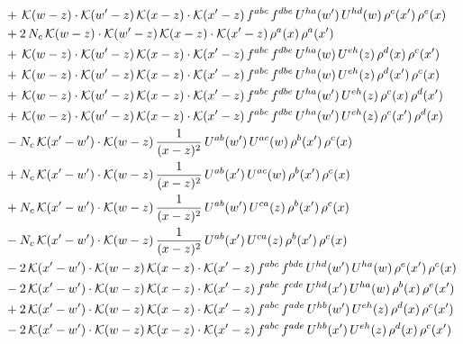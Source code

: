 \documentclass[9pt]{article}
\numberwithin{equation}{section}
\begin{document}
\begin{align}
&+\,\mathcal{K}(w-z)\cdot\mathcal{K}(w'-z)\,\mathcal{K}(x-z)\cdot\mathcal{K}(x'-z)\,f^{abc}\,f^{dbe}\,U^{ha}(w')\,U^{hd}(w)\,\rho^{c}(x')\,\rho^{e}(x)\notag\\
&+2\,N_{c}\,\mathcal{K}(w-z)\cdot\mathcal{K}(w'-z)\,\mathcal{K}(x-z)\cdot\mathcal{K}(x'-z)\,\rho^{a}(x)\,\rho^{a}(x')\notag\\
&+\,\mathcal{K}(w-z)\cdot\mathcal{K}(w'-z)\,\mathcal{K}(x-z)\cdot\mathcal{K}(x'-z)\,f^{abc}\,f^{dbe}\,U^{ha}(w)\,U^{eh}(z)\,\rho^{d}(x)\,\rho^{c}(x')\notag\\
&+\,\mathcal{K}(w-z)\cdot\mathcal{K}(w'-z)\,\mathcal{K}(x-z)\cdot\mathcal{K}(x'-z)\,f^{abc}\,f^{dbe}\,U^{ha}(w)\,U^{eh}(z)\,\rho^{d}(x')\,\rho^{c}(x)\notag\\
&+\,\mathcal{K}(w-z)\cdot\mathcal{K}(w'-z)\,\mathcal{K}(x-z)\cdot\mathcal{K}(x'-z)\,f^{abc}\,f^{dbe}\,U^{ha}(w')\,U^{eh}(z)\,\rho^{c}(x)\,\rho^{d}(x')\notag\\
&+\,\mathcal{K}(w-z)\cdot\mathcal{K}(w'-z)\,\mathcal{K}(x-z)\cdot\mathcal{K}(x'-z)\,f^{abc}\,f^{dbe}\,U^{ha}(w')\,U^{eh}(z)\,\rho^{c}(x')\,\rho^{d}(x)\notag\\
&-N_{c}\,\mathcal{K}(x'-w')\cdot\mathcal{K}(w-z)\,\frac{1}{(x-z)^{2}}\,U^{ab}(w')\,U^{ac}(w)\,\rho^{b}(x')\,\rho^{c}(x)\notag\\
&+N_{c}\,\mathcal{K}(x'-w')\cdot\mathcal{K}(w-z)\,\frac{1}{(x-z)^{2}}\,U^{ab}(x')\,U^{ac}(w)\,\rho^{b}(x')\,\rho^{c}(x)\notag\\
&+N_{c}\,\mathcal{K}(x'-w')\cdot\mathcal{K}(w-z)\,\frac{1}{(x-z)^{2}}\,U^{ab}(w')\,U^{ca}(z)\,\rho^{b}(x')\,\rho^{c}(x)\notag\\
&-N_{c}\,\mathcal{K}(x'-w')\cdot\mathcal{K}(w-z)\,\frac{1}{(x-z)^{2}}\,U^{ab}(x')\,U^{ca}(z)\,\rho^{b}(x')\,\rho^{c}(x)\notag\\
&-2\,\mathcal{K}(x'-w')\cdot\mathcal{K}(w-z)\,\mathcal{K}(x-z)\cdot\mathcal{K}(x'-z)\,f^{abc}\,f^{bde}\,U^{hd}(w')\,U^{ha}(w)\,\rho^{e}(x')\,\rho^{c}(x)\notag\\
&-2\,\mathcal{K}(x'-w')\cdot\mathcal{K}(w-z)\,\mathcal{K}(x-z)\cdot\mathcal{K}(x'-z)\,f^{abc}\,f^{cde}\,U^{hd}(x')\,U^{ha}(w)\,\rho^{b}(x)\,\rho^{e}(x')\notag\\
&+2\,\mathcal{K}(x'-w')\cdot\mathcal{K}(w-z)\,\mathcal{K}(x-z)\cdot\mathcal{K}(x'-z)\,f^{abc}\,f^{ade}\,U^{hb}(w')\,U^{eh}(z)\,\rho^{d}(x)\,\rho^{c}(x')\notag\\
&-2\,\mathcal{K}(x'-w')\cdot\mathcal{K}(w-z)\,\mathcal{K}(x-z)\cdot\mathcal{K}(x'-z)\,f^{abc}\,f^{ade}\,U^{hb}(x')\,U^{eh}(z)\,\rho^{d}(x)\,\rho^{c}(x')\notag\\

\end{align}
\end{document}
